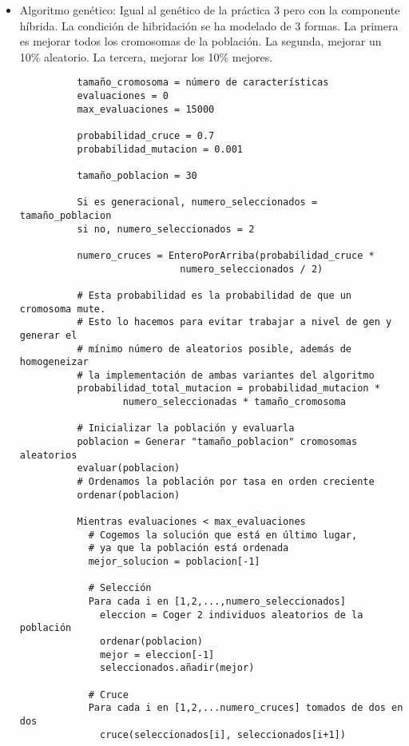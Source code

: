 \documentclass[a4paper, 11pt]{article}
\begin{document}
    \begin{itemize}
      \item Algoritmo genético: Igual al genético de la práctica 3 pero con
      la componente híbrida. La condición de hibridación se ha modelado de 3
      formas. La primera es mejorar todos los cromosomas de la población. La
      segunda, mejorar un 10\% aleatorio. La tercera, mejorar los 10\% mejores.
        \begin{verbatim}
          tamaño_cromosoma = número de características
          evaluaciones = 0
          max_evaluaciones = 15000

          probabilidad_cruce = 0.7
          probabilidad_mutacion = 0.001

          tamaño_poblacion = 30

          Si es generacional, numero_seleccionados = tamaño_poblacion
          si no, numero_seleccionados = 2

          numero_cruces = EnteroPorArriba(probabilidad_cruce *
                            numero_seleccionados / 2)

          # Esta probabilidad es la probabilidad de que un cromosoma mute.
          # Esto lo hacemos para evitar trabajar a nivel de gen y generar el
          # mínimo número de aleatorios posible, además de homogeneizar
          # la implementación de ambas variantes del algoritmo
          probabilidad_total_mutacion = probabilidad_mutacion *
                  numero_seleccionadas * tamaño_cromosoma

          # Inicializar la población y evaluarla
          poblacion = Generar "tamaño_poblacion" cromosomas aleatorios
          evaluar(poblacion)
          # Ordenamos la población por tasa en orden creciente
          ordenar(poblacion)

          Mientras evaluaciones < max_evaluaciones
            # Cogemos la solución que está en último lugar,
            # ya que la población está ordenada
            mejor_solucion = poblacion[-1]

            # Selección
            Para cada i en [1,2,...,numero_seleccionados]
              eleccion = Coger 2 individuos aleatorios de la población
              ordenar(poblacion)
              mejor = eleccion[-1]
              seleccionados.añadir(mejor)

            # Cruce
            Para cada i en [1,2,...numero_cruces] tomados de dos en dos
              cruce(seleccionados[i], seleccionados[i+1])


\end{verbatim}
\end{itemize}
\end{document}
